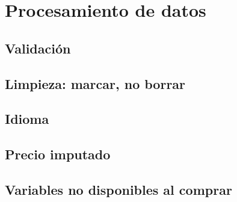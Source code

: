 \section{Procesamiento de datos}\label{sec:procesamiento}

\subsection{Validación}

\subsection{Limpieza: marcar, no borrar}\label{sec:procesamiento-limpieza}

\subsection{Idioma}

\subsection{Precio imputado}

\subsection{Variables no disponibles al comprar}
